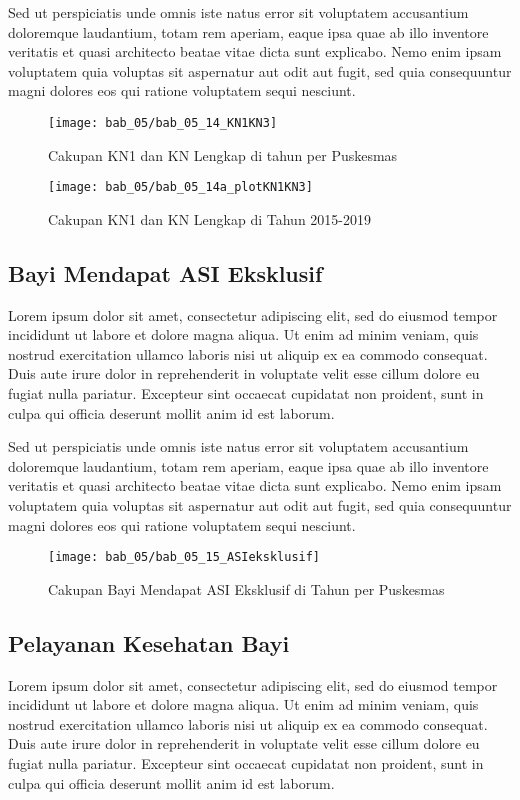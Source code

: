 Sed ut perspiciatis unde omnis iste natus error sit voluptatem accusantium doloremque laudantium, totam rem aperiam, eaque ipsa quae ab illo inventore veritatis et quasi architecto beatae vitae dicta sunt explicabo. Nemo enim ipsam voluptatem quia voluptas sit aspernatur aut odit aut fugit, sed quia consequuntur magni dolores eos qui ratione voluptatem sequi nesciunt.

\begin{figure}[H]
    \centering
    \texttt{[image: bab\_05/bab\_05\_14\_KN1KN3]}
    \caption{Cakupan KN1 dan KN Lengkap di \namaKabupaten tahun \tP per Puskesmas}
    \label{fig:Cakupan-KN1-KNlengkap}
\end{figure}

\begin{figure}[H]
    \centering
    \texttt{[image: bab\_05/bab\_05\_14a\_plotKN1KN3]}
    \caption{Cakupan KN1 dan KN Lengkap di \namaKabupaten Tahun 2015-2019}
    \label{fig:KN1-KNlengkap-2015-2019}
\end{figure}

\subsection{Bayi Mendapat ASI Eksklusif}
Lorem ipsum dolor sit amet, consectetur adipiscing elit, sed do eiusmod tempor incididunt ut labore et dolore magna aliqua. Ut enim ad minim veniam, quis nostrud exercitation ullamco laboris nisi ut aliquip ex ea commodo consequat. Duis aute irure dolor in reprehenderit in voluptate velit esse cillum dolore eu fugiat nulla pariatur. Excepteur sint occaecat cupidatat non proident, sunt in culpa qui officia deserunt mollit anim id est laborum.

Sed ut perspiciatis unde omnis iste natus error sit voluptatem accusantium doloremque laudantium, totam rem aperiam, eaque ipsa quae ab illo inventore veritatis et quasi architecto beatae vitae dicta sunt explicabo. Nemo enim ipsam voluptatem quia voluptas sit aspernatur aut odit aut fugit, sed quia consequuntur magni dolores eos qui ratione voluptatem sequi nesciunt.

\begin{figure}[H]
  \centering
  \texttt{[image: bab\_05/bab\_05\_15\_ASIeksklusif]}
  \caption{Cakupan Bayi Mendapat ASI Eksklusif di \namaKabupaten Tahun \tP per Puskesmas}
  \label{fig:Cakupan-Bayi-ASI-Eksklusif}
\end{figure}

\subsection{Pelayanan Kesehatan Bayi}
Lorem ipsum dolor sit amet, consectetur adipiscing elit, sed do eiusmod tempor incididunt ut labore et dolore magna aliqua. Ut enim ad minim veniam, quis nostrud exercitation ullamco laboris nisi ut aliquip ex ea commodo consequat. Duis aute irure dolor in reprehenderit in voluptate velit esse cillum dolore eu fugiat nulla pariatur. Excepteur sint occaecat cupidatat non proident, sunt in culpa qui officia deserunt mollit anim id est laborum.

